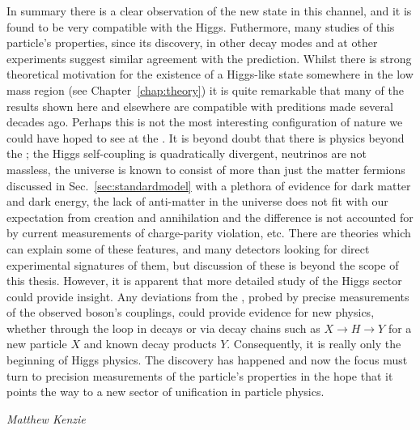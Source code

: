 In summary there is a clear observation of the new state in this channel, and it is found to be very compatible with the \SM Higgs. Futhermore, many studies of this particle's properties, since its discovery, in other decay modes and at other experiments suggest similar agreement with the \SM prediction. Whilst there is strong theoretical motivation for the existence of a Higgs-like state somewhere in the low mass region (see Chapter~\ref{chap:theory}) it is quite remarkable that many of the results shown here and elsewhere are compatible with preditions made several decades ago. Perhaps this is not the most interesting configuration of nature we could have hoped to see at the \LHC. It is beyond doubt that there is physics beyond the \SM; the Higgs self-coupling is quadratically divergent, neutrinos are not massless, the universe is known to consist of more than just the matter fermions discussed in Sec.~\ref{sec:standardmodel} with a plethora of evidence for dark matter and dark energy, the lack of anti-matter in the universe does not fit with our expectation from creation and annihilation and the difference is not accounted for by current measurements of charge-parity violation, etc. There are theories which can explain some of these features, and many detectors looking for direct experimental signatures of them, but discussion of these is beyond the scope of this thesis. However, it is apparent that more detailed study of the Higgs sector could provide insight. Any deviations from the \SM, probed by precise measurements of the observed boson's couplings, could provide evidence for new physics, whether through the loop in \Hgg decays or via decay chains such as $X\rightarrow H\rightarrow Y$ for a new particle $X$ and known decay products $Y$. Consequently, it is really only the beginning of Higgs physics. The discovery has happened and now the focus must turn to precision measurements of the particle's properties in the hope that it points the way to a new sector of unification in particle physics.

\hfill\textit{Matthew Kenzie}
